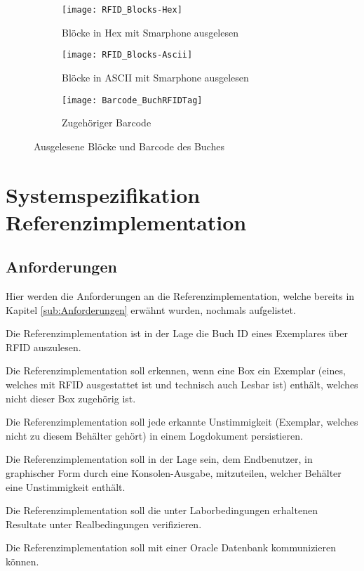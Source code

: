 \begin{figure}[p]
	\centering
	\begin{subfigure}[t]{.45\textwidth}
		\centering
		\texttt{[image: RFID\_Blocks-Hex]}
		\caption{Blöcke in Hex mit Smarphone ausgelesen}
	\end{subfigure}
	\begin{subfigure}[t]{.45\textwidth}
		\centering
		\texttt{[image: RFID\_Blocks-Ascii]}
		\caption{Blöcke in ASCII mit Smarphone ausgelesen}
	\end{subfigure}
	\begin{subfigure}[b]{.3\textwidth}
		\centering
		\texttt{[image: Barcode\_BuchRFIDTag]}
		\caption{Zugehöriger Barcode}
	\end{subfigure}
	\caption{Ausgelesene Blöcke und Barcode des Buches}
	\label{fig:AusgeleseneBloeckeUndBarcode}
\end{figure}


\clearpage
\section{Systemspezifikation Referenzimplementation}
\label{sec:SysSpec}

\subsection{Anforderungen}
\label{sub:ReferenzimplementationAnforderungen}
Hier werden die Anforderungen an die Referenzimplementation, welche bereits in Kapitel \ref{sub:Anforderungen} erwähnt wurden, nochmals aufgelistet.
\begin{legal}
	\item Die Referenzimplementation ist in der Lage die Buch ID eines Exemplares über RFID auszulesen.
	\item Die Referenzimplementation soll erkennen, wenn eine Box ein Exemplar (eines, welches mit RFID ausgestattet ist und technisch auch Lesbar ist) enthält, welches nicht dieser Box zugehörig ist.
	\item Die Referenzimplementation soll jede erkannte Unstimmigkeit (Exemplar, welches nicht zu diesem Behälter gehört) in einem Logdokument persistieren.
	\item Die Referenzimplementation soll in der Lage sein, dem Endbenutzer, in graphischer Form durch eine Konsolen-Ausgabe, mitzuteilen, welcher Behälter eine Unstimmigkeit enthält.
	\item Die Referenzimplementation soll die unter Laborbedingungen erhaltenen Resultate unter Realbedingungen verifizieren.
	\item Die Referenzimplementation soll mit einer Oracle Datenbank kommunizieren können.
\end{legal}

